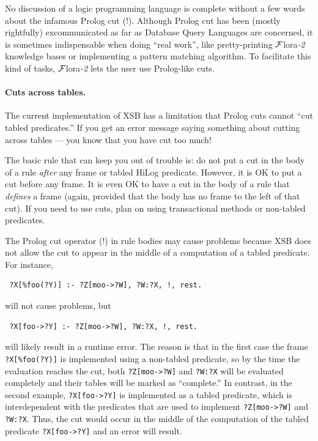 \documentclass[11pt]{article}
\newcommand{\FLORA}{{\mbox{\sc ${\cal F}${lora}\rm\emph{-2}}}\xspace}
\newcommand{\FLSYSTEM}{\FLORA}
\begin{document}
\index{cut!in \FLSYSTEM}
No discussion of a logic programming language is complete without a few
words about the infamous Prolog cut (!). Although Prolog cut has been
(mostly rightfully) excommunicated as far as Database Query Languages are
concerned, it is sometimes indispensable when doing ``real work'', like
pretty-printing \FLSYSTEM knowledge bases or implementing a pattern matching
algorithm.  To facilitate this kind of tasks, \FLSYSTEM lets the user
use Prolog-like cuts. 

\paragraph{Cuts across tables.}
The current implementation of XSB has a limitation that
Prolog cuts cannot ``cut tabled predicates.''  If you get an error
message saying something about cutting across tables --- you know that
you have cut too much!

The basic rule that can keep you out of trouble is: do not put a cut in the
body of a rule \emph{after} any frame or tabled  HiLog
predicate. However, it is OK to put a cut before any frame. It is
even OK to have a cut in the body of a rule that \emph{defines} a
frame (again, provided that the body has no frame to the left of
that cut). If you need to use cuts, plan on using transactional methods or
non-tabled predicates.

The Prolog cut operator (!) in rule bodies may cause problems because
XSB does not allow the cut to appear in the middle of a computation of a
tabled predicate. For instance,
\begin{verbatim}
 ?X[%foo(?Y)] :- ?Z[moo->?W], ?W:?X, !, rest.  
\end{verbatim}
will not cause problems, but
\begin{verbatim}
 ?X[foo->?Y] :- ?Z[moo->?W], ?W:?X, !, rest.  
\end{verbatim}
will likely result in a runtime error. The reason is that in the first case
the frame \verb|?X[%foo(?Y)]| is implemented using a non-tabled predicate, so
by the time the evaluation reaches the cut, both \verb|?Z[moo->?W]| and 
{\tt ?W:?X} will be evaluated completely and their tables will be marked as
``complete.'' In contrast, in the second example, \verb|?X[foo->?Y]| is
implemented as a tabled predicate, which is interdependent with the
predicates that are used to implement \verb|?Z[moo->?W]| and 
{\tt ?W:?X}. Thus, the cut would occur in the middle of the computation of
the tabled predicate \verb|?X[foo->?Y]| and an error will result.
\end{document}
